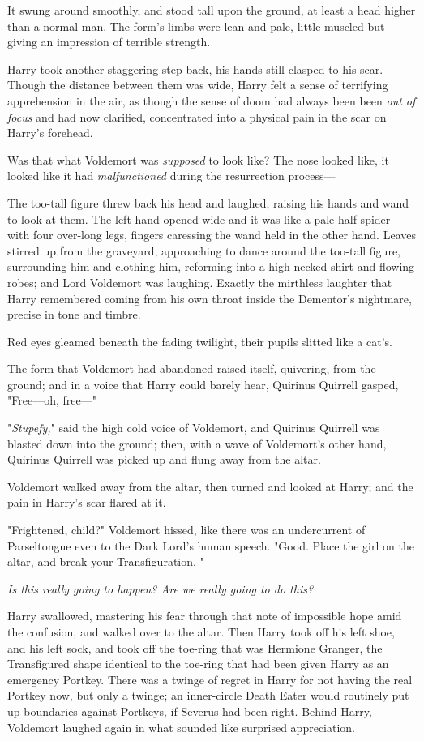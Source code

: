 It swung around smoothly, and stood tall upon the ground, at least a head
higher than a normal man. The form's limbs were lean and pale, little-muscled
but giving an impression of terrible strength.

Harry took another staggering step back, his hands still clasped to his scar.
Though the distance between them was wide, Harry felt a sense of terrifying
apprehension in the air, as though the sense of doom had always been been
\emph{out of focus} and had now clarified, concentrated into a physical pain in
the scar on Harry's forehead.

Was that what Voldemort was \emph{supposed} to look like? The nose looked like,
it looked like it had \emph{malfunctioned} during the resurrection process\mbox{---}

The too-tall figure threw back his head and laughed, raising his hands and wand
to look at them. The left hand opened wide and it was like a pale half-spider
with four over-long legs, fingers caressing the wand held in the other hand.
Leaves stirred up from the graveyard, approaching to dance around the too-tall
figure, surrounding him and clothing him, reforming into a high-necked shirt
and flowing robes; and Lord Voldemort was laughing. Exactly the mirthless
laughter that Harry remembered coming from his own throat inside the Dementor's
nightmare, precise in tone and timbre.

Red eyes gleamed beneath the fading twilight, their pupils slitted like a cat's.

The form that Voldemort had abandoned raised itself, quivering, from the
ground; and in a voice that Harry could barely hear, Quirinus Quirrell gasped,
"Free---oh, free\mbox{---}"

"\emph{Stupefy,}" said the high cold voice of Voldemort, and Quirinus Quirrell
was blasted down into the ground; then, with a wave of Voldemort's other hand,
Quirinus Quirrell was picked up and flung away from the altar.

Voldemort walked away from the altar, then turned and looked at Harry; and the
pain in Harry's scar flared at it.

"Frightened, child?" Voldemort hissed, like there was an undercurrent of
Parseltongue even to the Dark Lord's human speech. "Good. Place the girl on the
altar, and break your Transfiguration. "

\emph{Is this really going to happen? Are we really going to do this?}

Harry swallowed, mastering his fear through that note of impossible hope amid
the confusion, and walked over to the altar. Then Harry took off his left shoe,
and his left sock, and took off the toe-ring that was Hermione Granger, the
Transfigured shape identical to the toe-ring that had been given Harry as an
emergency Portkey. There was a twinge of regret in Harry for not having the
real Portkey now, but only a twinge; an inner-circle Death Eater would
routinely put up boundaries against Portkeys, if Severus had been right. Behind
Harry, Voldemort laughed again in what sounded like surprised appreciation.

